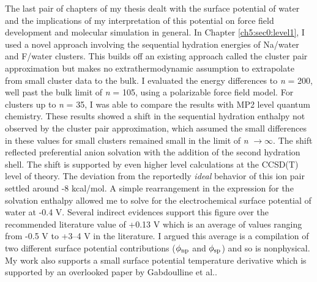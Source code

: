 \begin{conclude}
  The last pair of chapters of my thesis dealt with the surface potential of water and the implications of my interpretation of this potential on force
  field development and molecular simulation in general. In Chapter \ref{ch5:sec0:level1}, I used a novel approach involving the sequential hydration
  energies of Na\sur{+}/water and F\sur{-}/water clusters. This builds off an existing approach called the cluster pair approximation but makes no 
  extrathermodynamic assumption to extrapolate from small cluster data to the bulk. I evaluated the energy differences to \emph{n}
  = 200, well past the bulk limit of \emph{n} = 105, using a polarizable force field model. For clusters up to \emph{n} = 35, I was able to compare the
  results with MP2 level quantum chemistry. These results showed a shift in the sequential hydration enthalpy not observed by the cluster pair approximation,
  which assumed the small differences in these values for small clusters remained small in the limit of \emph{n} $\rightarrow \infty$. The shift reflected
  preferential anion solvation with the addition of the second hydration shell. The shift is supported by even higher level calculations at the CCSD(T)
  level of theory. The deviation from the reportedly \emph{ideal} behavior of this ion pair settled around -8 kcal/mol. A simple rearrangement in the
  expression for the solvation enthalpy allowed me to solve for the electrochemical surface potential of water at -0.4 V. Several indirect evidences
  support this figure over the recommended literature value of +0.13 V which is an average of values ranging from -0.5 V to +3--4 V in the literature.
  I argued this average is a compilation of two different surface potential contributions ($\phi_{\mathrm{np}}$ and $\phi_{\mathrm{sp}}$) and so is nonphysical.
  My work also supports a small surface potential temperature derivative which is supported by an overlooked paper by Gabdoulline et al.\cite{gabdoulline1997mean}.
  

\end{conclude}
